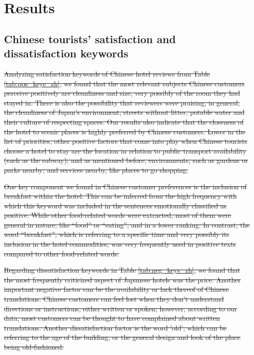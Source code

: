 \documentclass[review]{elsarticle}
\providecommand{\DIFdel}[1]{{\protect\color{red}\sout{#1}}}                      %
\providecommand{\DIFdelbegin}{} %
\newcommand{\DIFscaledelfig}{0.5}
\newlength{\DIFdelgraphicswidth} %
\newlength{\DIFdelgraphicsheight} %
\newcommand{\DIFdelincludegraphics}[2][]{%
\sbox{\DIFdelgraphicsbox}{\DIFOincludegraphics[#1]{#2}}%
\settoboxwidth{\DIFdelgraphicswidth}{\DIFdelgraphicsbox} %
\settoboxtotalheight{\DIFdelgraphicsheight}{\DIFdelgraphicsbox} %
\scalebox{\DIFscaledelfig}{%
\parbox[b]{\DIFdelgraphicswidth}{\usebox{\DIFdelgraphicsbox}\\[-\baselineskip] \rule{\DIFdelgraphicswidth}{0em}}\llap{\resizebox{\DIFdelgraphicswidth}{\DIFdelgraphicsheight}{%
\setlength{\unitlength}{\DIFdelgraphicswidth}%
\begin{picture}(1,1)%
\thicklines\linethickness{2pt} %
{\color[rgb]{1,0,0}\put(0,0){\framebox(1,1){}}}%
{\color[rgb]{1,0,0}\put(0,0){\line( 1,1){1}}}%
{\color[rgb]{1,0,0}\put(0,1){\line(1,-1){1}}}%
\end{picture}%
}\hspace*{3pt}}} %
} %
\DeclareRobustCommand{\DIFdelbegin}{\DIFOdelbegin \let\includegraphics\DIFdelincludegraphics} %
\begin{document}
\section{Results}\label{results}

\subsection{Chinese tourists' satisfaction and dissatisfaction keywords}

\DIFdelbegin
\DIFdel{Analyzing satisfaction keywords of Chinese hotel reviews from Table \ref{tab:pos_keys_zh}, we found that the most relevant subjects Chinese customers perceive positively are cleanliness and size, very possibly of the room they had stayed in. There is also the possibility that reviewers were praising, in general, the cleanliness of Japan’s environment, streets without litter, potable water and their culture of respecting spaces. Our results also indicate that the closeness of the hotel to scenic places is highly preferred by Chinese customers. Lower in the list of priorities, other positive factors that come into play when Chinese tourists choose a hotel to stay are the location in relation to public transport availability (such as the subway); and as mentioned before, environments, such as gardens or parks nearby; and services nearby, like places to go shopping. 
}%

\DIFdel{One key component we found in Chinese customer preferences is the inclusion of breakfast within the hotel. This can be inferred from the high frequency with which this keyword was included in the sentences emotionally classified as positive. While other food-related words were extracted, most of them were general in nature, like “food” or “eating”, and in a lower ranking. In contrast, the word “breakfast”, which is referring to a specific time and very possibly its inclusion in the hotel commodities, was very frequently used in positive texts compared to other food-related words. 
}%

\DIFdel{Regarding dissatisfaction keywords in Table \ref{tab:neg_keys_zh}, we found that the most frequently criticized aspect of Japanese hotels was the price. Another important negative factor can be the availability or lack thereof of Chinese translations. Chinese customers can feel lost when they don't understand directions or instructions, either written or spoken; however, according to our data, most customers can be thought to have complained about written translations. Another dissatisfaction factor is the word 'old', which can be referring to the age of the building, or the general design and look of the place being old-fashioned.
}%
\end{document}
